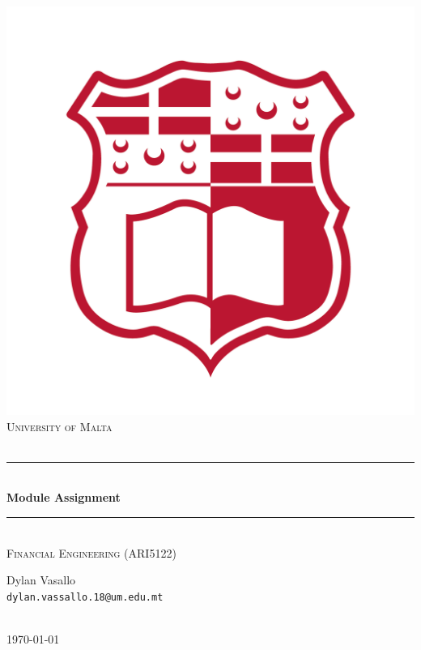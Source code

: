 \begin{titlepage}
\newcommand{\HRule}{\rule{\linewidth}{0.5mm}}
\center
\includegraphics[scale=0.15]{imgs/logo.png}\\[0.5cm] 
\textsc{\LARGE University of Malta}\\[0.3cm]
\textsc{}\\[2.5cm] 
\HRule \\[0.4cm]
{ \huge \bfseries Module Assignment }\\[0.4cm] %
\HRule \\[.5cm]
\textsc{\large Financial Engineering (ARI5122)}\\[2.5cm] 

\begin{minipage}{0.4\textwidth}
\centering
\large{Dylan Vasallo} \\[0.2cm] \small \texttt{dylan.vassallo.18@um.edu.mt}
\end{minipage}\\[1cm]

{\medium \monthyeardate\today}
\end{titlepage}

\tableofcontents
